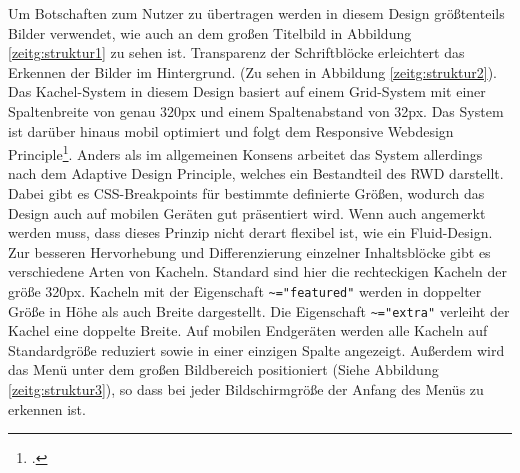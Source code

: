Um Botschaften zum Nutzer zu übertragen werden in diesem Design größtenteils Bilder verwendet, wie auch an dem großen Titelbild in Abbildung \ref{zeitg:struktur1} zu sehen ist. Transparenz der Schriftblöcke erleichtert das Erkennen der Bilder im Hintergrund. (Zu sehen in Abbildung \ref{zeitg:struktur2}).
Das Kachel-System in diesem Design basiert auf einem Grid-System mit einer Spaltenbreite von genau 320px und einem Spaltenabstand von 32px. Das System ist darüber hinaus mobil optimiert und folgt dem Responsive Webdesign Principle\footcite[vgl.][]{alistapart:rwd}. Anders als im allgemeinen Konsens arbeitet das System allerdings nach dem Adaptive Design Principle, welches ein Bestandteil des RWD darstellt. Dabei gibt es CSS-Breakpoints für bestimmte definierte Größen, wodurch das Design auch auf mobilen Geräten gut präsentiert wird. Wenn auch angemerkt werden muss, dass dieses Prinzip nicht derart flexibel ist, wie ein Fluid-Design.
Zur besseren Hervorhebung und Differenzierung einzelner Inhaltsblöcke gibt es verschiedene Arten von Kacheln. Standard sind hier die rechteckigen Kacheln der größe 320px. Kacheln mit der Eigenschaft \lstinline{~="featured"} werden in doppelter Größe in Höhe als auch Breite dargestellt. Die Eigenschaft \lstinline{~="extra"} verleiht der Kachel eine doppelte Breite.
Auf mobilen Endgeräten werden alle Kacheln auf Standardgröße reduziert sowie in einer einzigen Spalte angezeigt. Außerdem wird das Menü unter dem großen Bildbereich positioniert (Siehe Abbildung \ref{zeitg:struktur3}), so dass bei jeder Bildschirmgröße der Anfang des Menüs zu erkennen ist.
